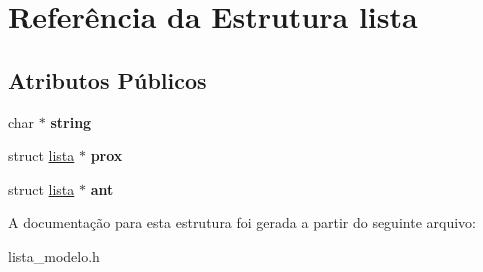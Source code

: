\hypertarget{structlista}{}\section{Referência da Estrutura lista}
\label{structlista}
\subsection*{Atributos Públicos}
\begin{DoxyCompactItemize}
\item 
\mbox{\label{structlista_a1ba5a9f199d6bf09cb40c905d50685f0}} 
char $\ast$ {\bfseries string}
\item 
\mbox{\label{structlista_a3b0e375147c1163d74544fd206a1f1de}} 
struct \hyperlink{structlista}{lista} $\ast$ {\bfseries prox}
\item 
\mbox{\label{structlista_a92e5a9da9a7788d2a85de746a88b336f}} 
struct \hyperlink{structlista}{lista} $\ast$ {\bfseries ant}
\end{DoxyCompactItemize}


A documentação para esta estrutura foi gerada a partir do seguinte arquivo\+:\begin{DoxyCompactItemize}
\item 
lista\+\_\+modelo.\+h\end{DoxyCompactItemize}
